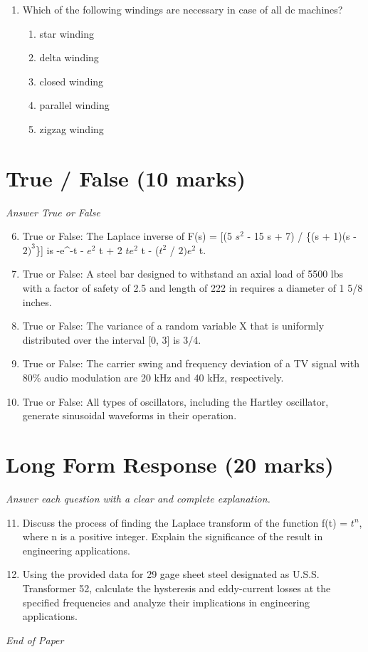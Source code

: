 \documentclass[12pt]{article}
\begin{document}
\begin{enumerate}[label=\arabic*.]
\begin{enumerate}[label=(\alph*)]
    \item E(X) = 5/3, Var(X) = 5/9
    \item E(X) = 1, Var(X) = 2/3
    \item E(X) = 3/4, Var(X) = 3/8
\end{enumerate}
\item Which of the following windings are necessary in case of all dc machines?
\begin{enumerate}[label=(\alph*)]
    \item star winding
    \item delta winding
    \item closed winding
    \item parallel winding
    \item zigzag winding
\end{enumerate}
\end{enumerate}

\section*{True / False (10 marks)}
\textit{Answer True or False}
\begin{enumerate}[label=\arabic*.]
\setcounter{enumi}{5}
\item True or False: The Laplace inverse of F(s) = [(5 $s^2$ - 15 s + 7) / \{(s + 1)(s - $2)^3$\}] is -e^-t - $e^2$ t + 2 $te^2$ t - ($t^2$ / $2)e^2$ t.
\item True or False: A steel bar designed to withstand an axial load of 5500 lbs with a factor of safety of 2.5 and length of 222 in requires a diameter of 1 5/8 inches.
\item True or False: The variance of a random variable X that is uniformly distributed over the interval [0, 3] is 3/4.
\item True or False: The carrier swing and frequency deviation of a TV signal with 80\% audio modulation are 20 kHz and 40 kHz, respectively.
\item True or False: All types of oscillators, including the Hartley oscillator, generate sinusoidal waveforms in their operation.
\end{enumerate}

\section*{Long Form Response (20 marks)}
\textit{Answer each question with a clear and complete explanation.}
\begin{enumerate}[label=\arabic*.]
\setcounter{enumi}{10}
\item Discuss the process of finding the Laplace transform of the function f(t) = $t^n$, where n is a positive integer. Explain the significance of the result in engineering applications.
\item Using the provided data for 29 gage sheet steel designated as U.S.S. Transformer 52, calculate the hysteresis and eddy-current losses at the specified frequencies and analyze their implications in engineering applications.
\end{enumerate}

\vfill
\noindent\textit{End of Paper}
\end{document}
